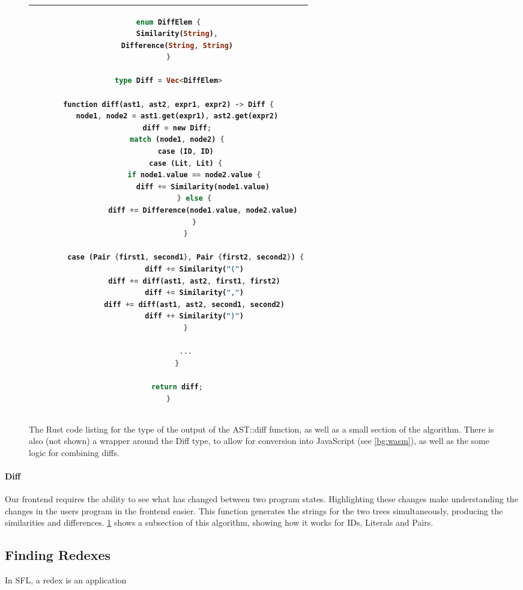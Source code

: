 \begin{figure}[t]
    \centering
    \begin{tabular}{|c|}
        \hline
    \begin{lstlisting}[language=Rust]
enum DiffElem {
    Similarity(String),
    Difference(String, String)
}

type Diff = Vec<DiffElem>

function diff(ast1, ast2, expr1, expr2) -> Diff {
    node1, node2 = ast1.get(expr1), ast2.get(expr2)
    diff = new Diff;
    match (node1, node2) {
        case (ID, ID)
        case (Lit, Lit) {
            if node1.value == node2.value {
                diff += Similarity(node1.value)
            } else {
                diff += Difference(node1.value, node2.value)
            }
        }

        case (Pair {first1, second1}, Pair {first2, second2}) {
            diff += Similarity("(")
            diff += diff(ast1, ast2, first1, first2)
            diff += Similarity(",")
            diff += diff(ast1, ast2, second1, second2)
            diff ++ Similarity(")")
        }

        ...
    }
    
    return diff;
}
    \end{lstlisting}
    \\\hline
    \end{tabular}
    \caption{The Rust code listing for the type of the output of the AST::diff function, as well as a small section of the algorithm. There is also (not shown) a wrapper around the Diff type, to allow for conversion into JavaScript (see \ref{bg:wasm}), as well as the some logic for combining diffs.}
    \label{fig:diff_list}
\end{figure}

\paragraph{Diff} \label{paragraph:diff} Our frontend requires the ability to see what has changed between two program states. Highlighting these changes make understanding the changes in the users program in the frontend easier. This function generates the strings for the two trees simultaneously, producing the similarities and differences. \ref{fig:diff_list} shows a subsection of this algorithm, showing how it works for IDs, Literals and Pairs.

\subsection{Finding Redexes}
In SFL, a redex is an application

